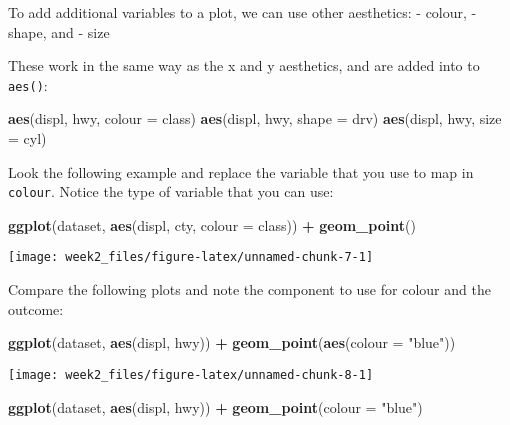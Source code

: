 \documentclass[
]{article}
\newenvironment{Shaded}{\begin{snugshade}}{\end{snugshade}}
\newcommand{\DataTypeTok}[1]{\textcolor[rgb]{0.13,0.29,0.53}{#1}}
\newcommand{\KeywordTok}[1]{\textcolor[rgb]{0.13,0.29,0.53}{\textbf{#1}}}
\newcommand{\NormalTok}[1]{#1}
\newcommand{\OperatorTok}[1]{\textcolor[rgb]{0.81,0.36,0.00}{\textbf{#1}}}
\newcommand{\StringTok}[1]{\textcolor[rgb]{0.31,0.60,0.02}{#1}}
\begin{document}
To add additional variables to a plot, we can use other aesthetics: -
colour, - shape, and - size

These work in the same way as the x and y aesthetics, and are added into
to \texttt{aes()}:

\begin{Shaded}
\begin{Highlighting}[]
\KeywordTok{aes}\NormalTok{(displ, hwy, }\DataTypeTok{colour =}\NormalTok{ class)}
\KeywordTok{aes}\NormalTok{(displ, hwy, }\DataTypeTok{shape =}\NormalTok{ drv)}
\KeywordTok{aes}\NormalTok{(displ, hwy, }\DataTypeTok{size =}\NormalTok{ cyl)}
\end{Highlighting}
\end{Shaded}

Look the following example and replace the variable that you use to map
in \texttt{colour}. Notice the type of variable that you can use:

\begin{Shaded}
\begin{Highlighting}[]
\KeywordTok{ggplot}\NormalTok{(dataset, }\KeywordTok{aes}\NormalTok{(displ, cty, }\DataTypeTok{colour =}\NormalTok{ class)) }\OperatorTok{+}\StringTok{ }
\StringTok{  }\KeywordTok{geom_point}\NormalTok{()}
\end{Highlighting}
\end{Shaded}

\begin{center}\texttt{[image: week2\_files/figure-latex/unnamed-chunk-7-1]} \end{center}

Compare the following plots and note the component to use for colour and
the outcome:

\begin{Shaded}
\begin{Highlighting}[]
\KeywordTok{ggplot}\NormalTok{(dataset, }\KeywordTok{aes}\NormalTok{(displ, hwy)) }\OperatorTok{+}\StringTok{ }\KeywordTok{geom_point}\NormalTok{(}\KeywordTok{aes}\NormalTok{(}\DataTypeTok{colour =} \StringTok{"blue"}\NormalTok{))}
\end{Highlighting}
\end{Shaded}

\begin{center}\texttt{[image: week2\_files/figure-latex/unnamed-chunk-8-1]} \end{center}

\begin{Shaded}
\begin{Highlighting}[]
\KeywordTok{ggplot}\NormalTok{(dataset, }\KeywordTok{aes}\NormalTok{(displ, hwy)) }\OperatorTok{+}\StringTok{ }\KeywordTok{geom_point}\NormalTok{(}\DataTypeTok{colour =} \StringTok{"blue"}\NormalTok{)}
\end{Highlighting}
\end{Shaded}
\end{document}
